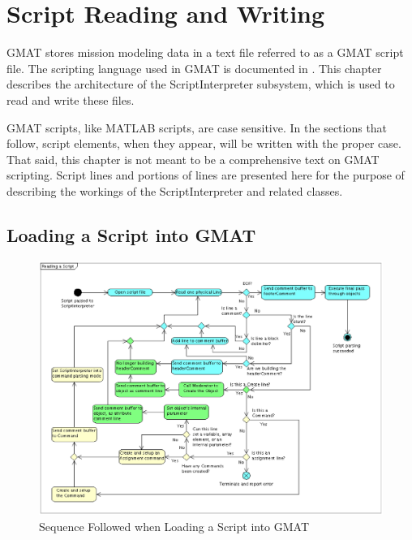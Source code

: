 \chapter{\label{chapter:ScriptRW}Script Reading and Writing}

GMAT stores mission modeling data in a text file referred to as a GMAT script file.  The scripting
language used in GMAT is documented in \cite{userGuide}.  This chapter describes the architecture of
the ScriptInterpreter subsystem, which is used to read and write these files.

GMAT scripts, like MATLAB scripts, are case sensitive.  In the sections that follow, script
elements, when they appear, will be written with the proper case.  That said, this chapter is not
meant to be a comprehensive text on GMAT scripting.  Script lines and portions of lines are
presented here for the purpose of describing the workings of the ScriptInterpreter and related
classes.

\section{\label{section:ReadingScript}Loading a Script into GMAT}

\begin{figure}[htb]
\begin{center}
\includegraphics[scale=0.5]{Images/ReadingaScript.eps}
\caption{\label{figure:ReadingScriptFlow}Sequence Followed when Loading a Script into GMAT}
\end{center}
\end{figure}

